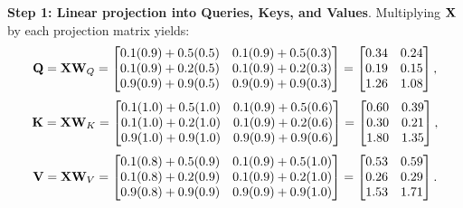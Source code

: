\documentclass[../../main.tex]{subfiles}
\begin{document}
\noindent\textbf{Step 1: Linear projection into Queries, Keys, and Values}.\newline
Multiplying $\mathbf{X}$ by each projection matrix yields:
\begin{equation}
\mathbf{Q} = \mathbf{X} \mathbf{W}_Q = \begin{bmatrix}
0.1(0.9) + 0.5(0.5) & 0.1(0.9) + 0.5(0.3) \\
0.1(0.9) + 0.2(0.5) & 0.1(0.9) + 0.2(0.3) \\
0.9(0.9) + 0.9(0.5) & 0.9(0.9) + 0.9(0.3)
\end{bmatrix} = \begin{bmatrix}
0.34 & 0.24 \\
0.19 & 0.15 \\
1.26 & 1.08
\end{bmatrix},
\end{equation}
\begin{equation}
\mathbf{K} = \mathbf{X} \mathbf{W}_K = \begin{bmatrix}
0.1(1.0) + 0.5(1.0) & 0.1(0.9) + 0.5(0.6) \\
0.1(1.0) + 0.2(1.0) & 0.1(0.9) + 0.2(0.6) \\
0.9(1.0) + 0.9(1.0) & 0.9(0.9) + 0.9(0.6)
\end{bmatrix} = \begin{bmatrix}
0.60 & 0.39 \\
0.30 & 0.21 \\
1.80 & 1.35
\end{bmatrix},
\end{equation}
\begin{equation}
\mathbf{V} = \mathbf{X} \mathbf{W}_V = \begin{bmatrix}
0.1(0.8) + 0.5(0.9) & 0.1(0.9) + 0.5(1.0) \\
0.1(0.8) + 0.2(0.9) & 0.1(0.9) + 0.2(1.0) \\
0.9(0.8) + 0.9(0.9) & 0.9(0.9) + 0.9(1.0)
\end{bmatrix} = \begin{bmatrix}
0.53 & 0.59 \\
0.26 & 0.29 \\
1.53 & 1.71
\end{bmatrix}.
\end{equation}
\end{document}
